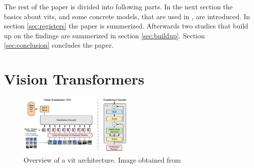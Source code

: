 \documentclass[conference]{IEEEtran}
\begin{document}
  The rest of the paper is divided into following parts. In the next section the basics about \acp{vit}, and some concrete models, that are used in \cite{registers}, are introduced. In section \ref{sec:registers} the paper \cite{registers} is summerized. Afterwards two studies that build up on the findings are summerized in section \ref{sec:buildup}. Section \ref{sec:conclusion} concludes the paper.

  \section{Vision Transformers}
  \label{sec:vits}

  \begin{figure}
    \centering
    \includegraphics[width=0.5\textwidth]{figures/vit-architecture.png}
    \caption{Overview of a \ac{vit} architecture. Image obtained from \cite{visiontransformers2021}}
    \label{fig:vit-architecture}
  \end{figure}
\end{document}
